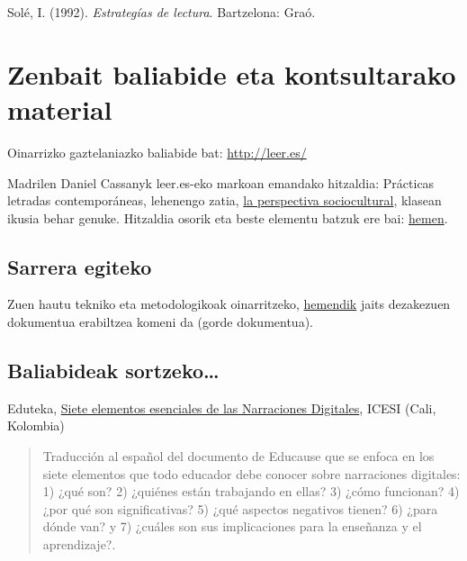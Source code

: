 \documentclass[]{book}
\begin{document}
Solé, I. (1992). \emph{Estrategías de lectura}. Bartzelona: Graó.

\hypertarget{zenbait-baliabide-eta-kontsultarako-material}{%
\chapter*{Zenbait baliabide eta kontsultarako material}\label{zenbait-baliabide-eta-kontsultarako-material}}

Oinarrizko gaztelaniazko baliabide bat: \url{http://leer.es/}

Madrilen Daniel Cassanyk leer.es-eko markoan emandako hitzaldia: Prácticas letradas contemporáneas, lehenengo zatia, \href{https://www.youtube.com/embed/lsHc3SWiWEQ}{la perspectiva sociocultural}, klasean ikusia behar genuke. Hitzaldia osorik eta beste elementu batzuk ere bai: \href{http://www.youtube.com/watch?v=lsHc3SWiWEQ\&list=PLB91A13AEFDB0D9B0\&index=3}{hemen}.

\hypertarget{sarrera-egiteko}{%
\section{Sarrera egiteko}\label{sarrera-egiteko}}

Zuen hautu tekniko eta metodologikoak oinarritzeko, \href{https://github.com/JuanAbasolo/HD/raw/03-gaia/05_hizkuntzen_irakaskuntzarako_metodoak.pdf}{hemendik} jaits dezakezuen dokumentua erabiltzea komeni da (gorde dokumentua).

\hypertarget{baliabideak-sortzeko}{%
\section{Baliabideak sortzeko\ldots{}}\label{baliabideak-sortzeko}}

Eduteka, \href{http://eduteka.icesi.edu.co/articulos/NarracionesDigitales_Educause}{Siete elementos esenciales de las Narraciones Digitales}, ICESI (Cali, Kolombia)

\begin{quote}
Traducción al español del documento de Educause que se enfoca en los
siete elementos que todo educador debe conocer sobre narraciones
digitales: 1) ¿qué son? 2) ¿quiénes están trabajando en ellas? 3) ¿cómo
funcionan? 4) ¿por qué son significativas? 5) ¿qué aspectos negativos
tienen? 6) ¿para dónde van? y 7) ¿cuáles son sus implicaciones para la
enseñanza y el aprendizaje?.
\end{quote}
\end{document}
